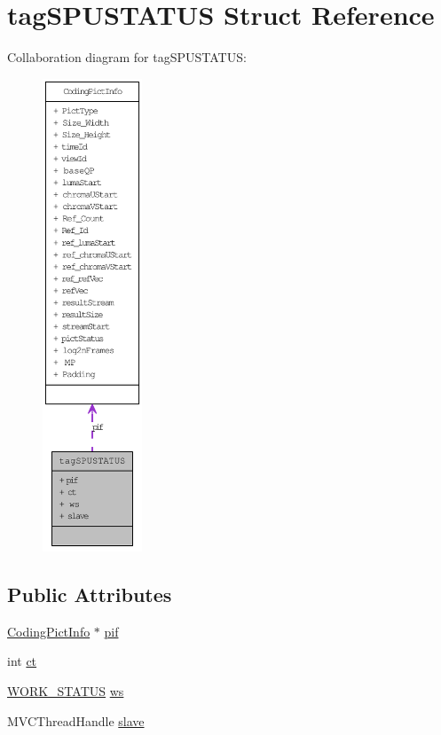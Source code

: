 \hypertarget{structtag_s_p_u_s_t_a_t_u_s}{
\section{tagSPUSTATUS Struct Reference}
\label{structtag_s_p_u_s_t_a_t_u_s}
}


Collaboration diagram for tagSPUSTATUS:\nopagebreak
\begin{figure}[H]
\begin{center}
\leavevmode
\includegraphics[height=400pt]{structtag_s_p_u_s_t_a_t_u_s__coll__graph}
\end{center}
\end{figure}
\subsection*{Public Attributes}
\begin{DoxyCompactItemize}
\item 
\hyperlink{struct_coding_pict_info}{CodingPictInfo} $\ast$ \hyperlink{structtag_s_p_u_s_t_a_t_u_s_a06878bf12155793c0264fd8e3ca8a4c8}{pif}
\item 
int \hyperlink{structtag_s_p_u_s_t_a_t_u_s_a0bac74b04f7e69e9a129f08ed21894dd}{ct}
\item 
\hyperlink{_task_dispatcher_8cpp_a02bbd7266c23c65371861ca915327f0f}{WORK\_\-STATUS} \hyperlink{structtag_s_p_u_s_t_a_t_u_s_af1a501a3875c176bf169bcb8fbedf2bf}{ws}
\item 
MVCThreadHandle \hyperlink{structtag_s_p_u_s_t_a_t_u_s_a527110a06626a2918c8f2129daafae57}{slave}
\end{DoxyCompactItemize}


